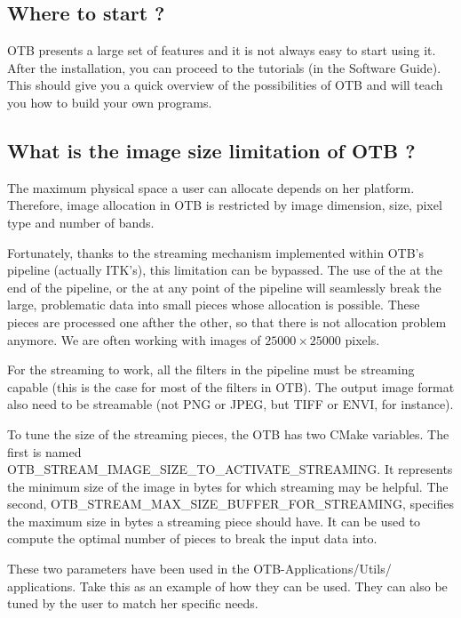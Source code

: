 \subsection{Where to start ?}

OTB presents a large set of features and it is not always easy to start using it.
After the installation, you can proceed to the tutorials (in the Software Guide). 
This should give you a quick overview of the possibilities of OTB and will teach 
you how to build your own programs.

\subsection{What is the image size limitation of OTB ?}

The maximum physical space a user can allocate depends on her platform. Therefore, 
image allocation in OTB is restricted by image dimension, size, pixel type and number 
of bands.

Fortunately, thanks to the streaming mechanism implemented within
OTB's pipeline (actually ITK's), this limitation can be bypassed. The
use of the  at the end of the pipeline,
or the  at any point of the pipeline will
seamlessly break the large, problematic data into small pieces whose
allocation is possible. These pieces are processed one afther the
other, so that there is not allocation problem anymore. We are often working with
images of $25000 \times 25000$ pixels.

For the streaming to work, all the filters in the pipeline must be streaming capable 
(this is the case for most of the filters in OTB). The output image format also need to be 
streamable (not PNG or JPEG, but TIFF or ENVI, for instance).

To tune the size of the streaming pieces, the OTB has
two CMake variables. The first is named
OTB\_STREAM\_IMAGE\_SIZE\_TO\_ACTIVATE\_STREAMING. It represents the
minimum size of the image in bytes for which streaming may be helpful. The
second, OTB\_STREAM\_MAX\_SIZE\_BUFFER\_FOR\_STREAMING, specifies the
maximum size in bytes a streaming piece should have. It can be used to
compute the optimal number of pieces to break the input data into.

These two parameters have been used in the OTB-Applications/Utils/
applications. Take this as an example of how they can be used. They
can also be tuned by the user to match her specific needs.


